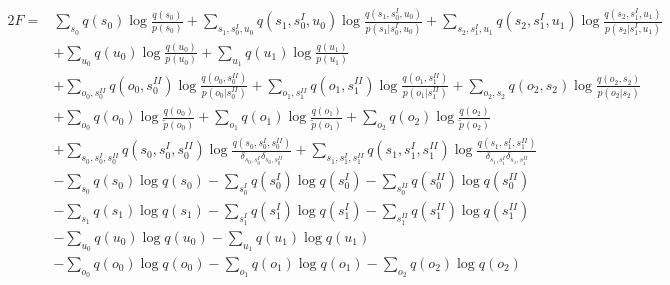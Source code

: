 \documentclass[fleqn]{article}
\begin{document}
\begin{alignat*}{2}
    F = &\sum_{s_0} q(s_0) \log \frac{q(s_0)}{p(s_0)} + \sum_{s_1, s^{\scriptscriptstyle I}_0, u_0} q(s_1, s^{\scriptscriptstyle I}_0, u_0) \log \frac{q(s_1, s^{\scriptscriptstyle I}_0, u_0)}{p(s_1| s^{\scriptscriptstyle I}_0, u_0)} + \sum_{s_2, s^{\scriptscriptstyle I}_1, u_1} q(s_2, s^{\scriptscriptstyle I}_1, u_1) \log \frac{q(s_2, s^{\scriptscriptstyle I}_1, u_1)}{p(s_2| s^{\scriptscriptstyle I}_1, u_1)} \\
    & + \sum_{u_0} q(u_0) \log \frac{q(u_0)}{p(u_0)} + \sum_{u_1} q(u_1) \log \frac{q(u_1)}{p(u_1)} \\
    & + \sum_{o_0, s^{\scriptscriptstyle II}_0} q(o_0, s^{\scriptscriptstyle II}_0) \log \frac{q(o_0, s^{\scriptscriptstyle II}_0)}{p(o_0| s^{\scriptscriptstyle II}_0)} + \sum_{o_1, s^{\scriptscriptstyle II}_1} q(o_1, s^{\scriptscriptstyle II}_1) \log \frac{q(o_1, s^{\scriptscriptstyle II}_1)}{p(o_1| s^{\scriptscriptstyle II}_1)} + \sum_{o_2, s_2} q(o_2, s_2) \log \frac{q(o_2, s_2)}{p(o_2| s_2)} \\
    & + \sum_{o_0} q(o_0) \log \frac{q(o_0)}{\tilde{p}(o_0)} + \sum_{o_1} q(o_1) \log \frac{q(o_1)}{\tilde{p}(o_1)} + \sum_{o_2} q(o_2) \log \frac{q(o_2)}{\tilde{p}(o_2)} \\
    & + \sum_{s_0, s^{\scriptscriptstyle I}_0, s^{\scriptscriptstyle II}_0} q(s_0, s^{\scriptscriptstyle I}_0, s^{\scriptscriptstyle II}_0) \log \frac{q(s_0, s^{\scriptscriptstyle I}_0, s^{\scriptscriptstyle II}_0)}{\delta_{s_0, s^{\scriptscriptstyle I}_0} \delta_{s_0, s^{\scriptscriptstyle II}_0}} + \sum_{s_1, s^{\scriptscriptstyle I}_1, s^{\scriptscriptstyle II}_1} q(s_1, s^{\scriptscriptstyle I}_1, s^{\scriptscriptstyle II}_1) \log \frac{q(s_1, s^{\scriptscriptstyle I}_1, s^{\scriptscriptstyle II}_1)}{\delta_{s_1, s^{\scriptscriptstyle I}_1} \delta_{s_1, s^{\scriptscriptstyle II}_1}} \\
    & - \sum_{s_0} q(s_0) \log q(s_0) - \sum_{s^{\scriptscriptstyle I}_0} q(s^{\scriptscriptstyle I}_0) \log q(s^{\scriptscriptstyle I}_0) - \sum_{s^{\scriptscriptstyle II}_0} q(s^{\scriptscriptstyle II}_0) \log q(s^{\scriptscriptstyle II}_0) \\
    & - \sum_{s_1} q(s_1) \log q(s_1) - \sum_{s^{\scriptscriptstyle I}_1} q(s^{\scriptscriptstyle I}_1) \log q(s^{\scriptscriptstyle I}_1) - \sum_{s^{\scriptscriptstyle II}_1} q(s^{\scriptscriptstyle II}_1) \log q(s^{\scriptscriptstyle II}_1) \\
    & - \sum_{u_0} q(u_0) \log q(u_0) - \sum_{u_1} q(u_1) \log q(u_1) \\
    & - \sum_{o_0} q(o_0) \log q(o_0) - \sum_{o_1} q(o_1) \log q(o_1) - \sum_{o_2} q(o_2) \log q(o_2)
\end{alignat*}
\end{document}
